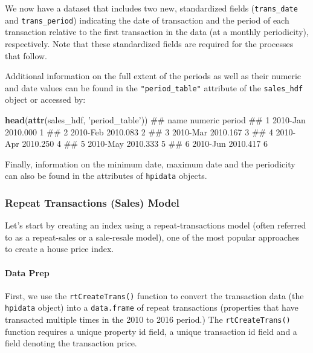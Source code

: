 \documentclass[]{article}
\newenvironment{Shaded}{\begin{snugshade}}{\end{snugshade}}
\newcommand{\KeywordTok}[1]{\textcolor[rgb]{0.13,0.29,0.53}{\textbf{#1}}}
\newcommand{\NormalTok}[1]{#1}
\newcommand{\StringTok}[1]{\textcolor[rgb]{0.31,0.60,0.02}{#1}}
\let\oldparagraph\paragraph
\renewcommand{\paragraph}[1]{\oldparagraph{#1}\mbox{}}
\begin{document}
We now have a dataset that includes two new, standardized fields
(\texttt{trans\_date} and \texttt{trans\_period}) indicating the date of
transaction and the period of each transaction relative to the first
transaction in the data (at a monthly periodicity), respectively. Note
that these standardized fields are required for the processes that
follow.

Additional information on the full extent of the periods as well as
their numeric and date values can be found in the
\texttt{"period\_table"} attribute of the \texttt{sales\_hdf} object or
accessed by:

\begin{Shaded}
\begin{Highlighting}[]
  \KeywordTok{head}\NormalTok{(}\KeywordTok{attr}\NormalTok{(sales_hdf, }\StringTok{'period_table'}\NormalTok{))}
\NormalTok{##       name  numeric period}
\NormalTok{## 1 2010-Jan 2010.000      1}
\NormalTok{## 2 2010-Feb 2010.083      2}
\NormalTok{## 3 2010-Mar 2010.167      3}
\NormalTok{## 4 2010-Apr 2010.250      4}
\NormalTok{## 5 2010-May 2010.333      5}
\NormalTok{## 6 2010-Jun 2010.417      6}
\end{Highlighting}
\end{Shaded}

Finally, information on the minimum date, maximum date and the
periodicity can also be found in the attributes of \texttt{hpidata}
objects.

\hypertarget{repeat-transactions-sales-model}{%
\subsubsection{Repeat Transactions (Sales)
Model}\label{repeat-transactions-sales-model}}

Let's start by creating an index using a repeat-transactions model
(often referred to as a repeat-sales or a sale-resale model), one of the
most popular approaches to create a house price index.

\hypertarget{data-prep}{%
\paragraph{Data Prep}\label{data-prep}}

First, we use the \texttt{rtCreateTrans()} function to convert the
transaction data (the \texttt{hpidata} object) into a
\texttt{data.frame} of repeat transactions (properties that have
transacted multiple times in the 2010 to 2016 period.) The
\texttt{rtCreateTrans()} function requires a unique property id field, a
unique transaction id field and a field denoting the transaction price.
\end{document}
